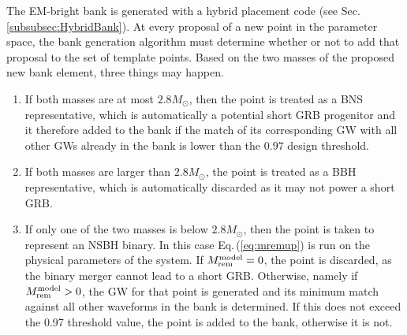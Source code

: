 \documentclass[binding=0.6cm, LaM]{sapthesis}
\begin{document}
      The EM-bright bank is generated with a hybrid placement code (see Sec.\,\ref{subsubsec:HybridBank}).  At every proposal of a new point in the parameter space, the bank generation algorithm must determine whether or not to add that proposal to the set of template points.  Based on the two masses of the proposed new bank element, three things may happen. 
      \begin{enumerate}
        \item If both masses are at most $2.8M_\odot$, then the point is treated as a BNS representative, which is automatically a potential short GRB progenitor and it therefore added to the bank if the match of its corresponding GW with all other GWs already in the bank is lower than the $0.97$ design threshold.
        \item If both masses are larger than $2.8M_\odot$, the point is treated as a BBH representative, which is automatically discarded as it may not power a short GRB.
        \item If only one of the two masses is below $2.8M_\odot$, then the point is taken to represent an NSBH binary. In this case Eq.\,(\ref{eq:mremup}) is run on the physical parameters of the system.  If $M_{\rm rem}^{\rm model}=0$, the point is discarded, as the binary merger cannot lead to a short GRB.  Otherwise, namely if $M_{\rm rem}^{\rm model}>0$, the GW for that point is generated and its minimum match against all other waveforms in the bank is determined.  If this does not exceed the 0.97 threshold value, the point is added to the bank, otherwise it is not.
        \end{enumerate}
\end{document}
